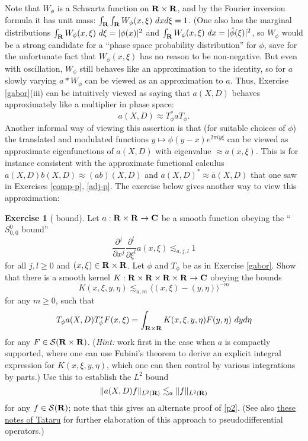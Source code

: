 \documentclass[11pt]{article}
\theoremstyle{definition}
\newtheorem{exercise}[theorem]{Exercise}
\theoremstyle{remark}
\begin{document}
Note that \({W_\phi}\) is a Schwartz function on \({{\bf R} \times {\bf R}}\), and by the Fourier inversion formula it has unit mass: \({\int_{\bf R} \int_{\bf R} W_\phi(x,\xi)\ dx d\xi = 1}\). (One also has the marginal distributions \({\int_{\bf R} W_\phi(x,\xi)\ d\xi = |\phi(x)|^2}\) and \({\int_{\bf R} W_\phi(x,\xi)\ dx = |\hat \phi(\xi)|^2}\), so \({W_\phi}\) would be a strong candidate for a “phase space probability distribution” for \({\phi}\), save for the unfortunate fact that \({W_\phi(x,\xi)}\) has no reason to be non-negative. But even with oscillation, \({W_\phi}\) still behaves like an approximation to the identity, so for \({a}\) slowly varying \({a*W_\phi}\) can be viewed as an approximation to \({a}\). Thus, Exercise \ref{gabor}(iii) can be intuitively viewed as saying that \({a(X,D)}\) behaves approximately like a multiplier in phase space: 
\[\displaystyle  a(X,D) \approx T_\phi^* a T_\phi.\]
 Another informal way of viewing this assertion is that (for suitable choices of \({\phi}\)) the translated and modulated functions \({y \mapsto \phi(y-x) e^{2\pi i y \xi}}\) can be viewed as approximate eigenfunctions of \({a(X,D)}\) with eigenvalue \({\approx a(x,\xi)}\). This is for instance consistent with the approximate functional calculus \({a(X,D) b(X,D) \approx (ab)(X,D)}\) and \({a(X,D)^* \approx \overline{a}(X,D)}\) that one saw in Exercises \ref{comp-p}, \ref{adj-p}. The exercise below gives another way to view this approximation:
\begin{exercise}[  bound]
  Let \({a: {\bf R} \times {\bf R} \rightarrow {\bf C}}\) be a smooth function obeying the “\({S^0_{0,0}}\) bound” 
\[\displaystyle \frac{\partial^j}{\partial x^j} \frac{\partial^l}{\partial \xi^l} a(x,\xi) \lesssim_{a,j,l} 1\]
 for all \({j,l \geq 0}\) and \({(x,\xi) \in {\bf R} \times {\bf R}}\). Let \({\phi}\) and \({T_\phi}\) be as in Exercise \ref{gabor}. Show that there is a smooth kernel \({K: {\bf R} \times {\bf R} \times {\bf R} \times {\bf R} \rightarrow {\bf C}}\) obeying the bounds 
\[\displaystyle  K( x,\xi, y,\eta ) \lesssim_{a,m} \langle (x,\xi) - (y,\eta) \rangle^{-m}\]
 for any \({m \geq 0}\), such that 
\[\displaystyle  T_\phi a(X,D) T_\phi^* F(x,\xi) = \int_{{\bf R} \times {\bf R}} K(x,\xi,y,\eta) F(y,\eta)\ dy d\eta\]
 for any \({F \in {\mathcal S}({\bf R} \times {\bf R})}\). (\emph{Hint:} work first in the case when \({a}\) is compactly supported, where one can use Fubini’s theorem to derive an explicit integral expression for \({K(x,\xi,y,\eta)}\), which one can then control by various integrations by parts.) Use this to establish the \({L^2}\) bound 
\[\displaystyle  \|a(X,D) f \|_{L^2({\bf R})} \lesssim_a \|f\|_{L^2({\bf R})}\]
 for any \({f \in {\mathcal S}({\bf R})}\); note that this gives an alternate proof of \eqref{p2}. (See also \href{https://math.berkeley.edu/~tataru/papers/phasespace.pdf}{these notes of Tataru} for further elaboration of this approach to pseudodifferential operators.) 
\end{exercise}
\end{document}
